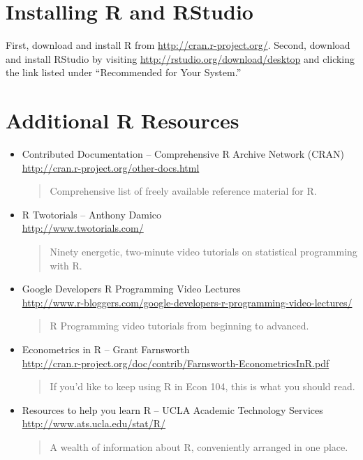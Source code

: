 \documentclass[11pt, letterpaper]{article}
\begin{document}
            
\section*{Installing R and RStudio} First, download and install R from \url{http://cran.r-project.org/}. Second, download and install RStudio by visiting \url{http://rstudio.org/download/desktop} and clicking the link listed under ``Recommended for Your System.'' 


\section*{Additional R Resources} 
\begin{itemize}
		       \item Contributed Documentation -- Comprehensive R Archive Network (CRAN) \\\url{http://cran.r-project.org/other-docs.html}
           	\begin{quote}
           		Comprehensive list of freely available reference material for R.
           	\end{quote}
\item R Twotorials -- Anthony Damico \\\url{http://www.twotorials.com/}
		\begin{quote}
		Ninety energetic, two-minute video tutorials on statistical programming with R. 
		\end{quote}
			\item Google Developers R Programming Video Lectures\\ \url{http://www.r-bloggers.com/google-developers-r-programming-video-lectures/}\begin{quote}R Programming video tutorials from beginning to advanced. \end{quote}
		 	\item Econometrics in R -- Grant Farnsworth\\\url{http://cran.r-project.org/doc/contrib/Farnsworth-EconometricsInR.pdf}
 		\begin{quote}
 		If you'd like to keep using R in Econ 104, this is what you should read.
 		\end{quote}
 			\item Resources to help you learn R -- UCLA Academic Technology Services \\\url{http://www.ats.ucla.edu/stat/R/}
		\begin{quote}
			A wealth of information about R, conveniently arranged in one place.
		\end{quote}

\end{itemize}
\end{document}
